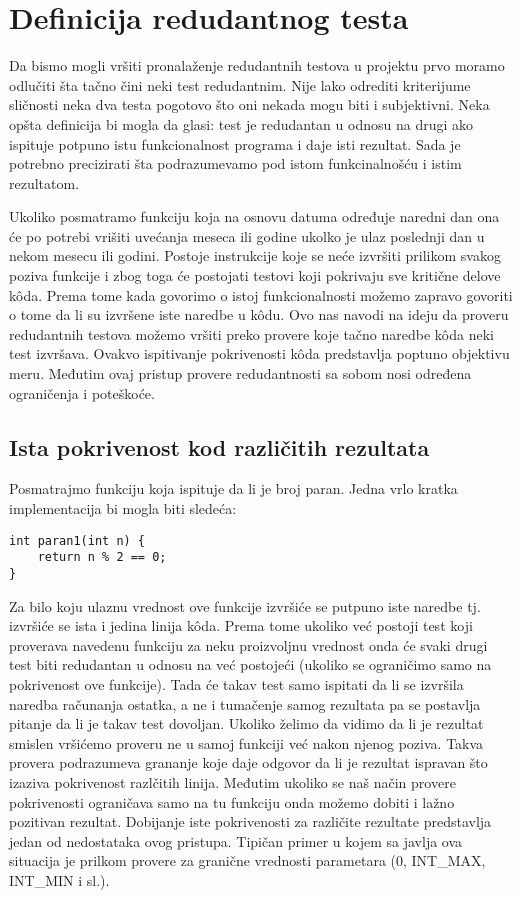 \documentclass[a4paper]{article}
\begin{document}
\section{Definicija redudantnog testa}
\label{sec:definition}
Da bismo mogli vršiti pronalaženje redudantnih testova u projektu prvo moramo odlučiti šta tačno čini neki test redudantnim. Nije lako odrediti kriterijume sličnosti neka dva testa pogotovo što oni nekada mogu biti i subjektivni. Neka opšta definicija bi mogla da glasi: test je redudantan u odnosu na drugi ako ispituje potpuno istu funkcionalnost programa i daje isti rezultat. Sada je potrebno precizirati šta podrazumevamo pod istom funkcinalnošću i istim rezultatom.

Ukoliko posmatramo funkciju koja na osnovu datuma određuje naredni dan ona će po potrebi vrišiti uvećanja meseca ili godine ukolko je ulaz poslednji dan u nekom mesecu ili godini. Postoje instrukcije koje se neće izvršiti prilikom svakog poziva funkcije i zbog toga će postojati testovi koji pokrivaju sve kritične delove kôda. Prema tome kada govorimo o istoj funkcionalnosti možemo zapravo govoriti o tome da li su izvršene iste naredbe u kôdu. Ovo nas navodi na ideju da proveru redudantnih testova možemo vršiti preko provere koje tačno naredbe kôda neki test izvršava. Ovakvo ispitivanje pokrivenosti kôda predstavlja poptuno objektivu meru. Međutim ovaj pristup provere redudantnosti sa sobom nosi određena ograničenja i poteškoće.

\subsection{Ista pokrivenost kod različitih rezultata}

Posmatrajmo funkciju koja ispituje da li je broj paran. Jedna vrlo kratka implementacija bi mogla biti sledeća:

\begin{lstlisting}
int paran1(int n) {
	return n % 2 == 0;
}
\end{lstlisting}

Za bilo koju ulaznu vrednost ove funkcije izvršiće se putpuno iste naredbe tj. izvršiće se ista i jedina linija kôda. Prema tome ukoliko već postoji test koji proverava navedenu funkciju za neku proizvoljnu vrednost onda će svaki drugi test biti redudantan u odnosu na već postojeći (ukoliko se ograničimo samo na pokrivenost ove funkcije). Tada će takav test samo ispitati da li se izvršila naredba računanja ostatka, a ne i tumačenje samog rezultata pa se postavlja pitanje da li je takav test dovoljan. Ukoliko želimo da vidimo da li je rezultat smislen vršićemo proveru ne u samoj funkciji već nakon njenog poziva. Takva provera podrazumeva grananje koje daje odgovor da li je rezultat ispravan što izaziva pokrivenost razlčitih linija. Međutim ukoliko se naš način provere pokrivenosti ograničava samo na tu funkciju onda možemo dobiti i lažno pozitivan rezultat. Dobijanje iste pokrivenosti za različite rezultate predstavlja jedan od nedostataka ovog pristupa. Tipičan primer u kojem sa javlja ova situacija je prilkom provere za granične vrednosti parametara (0, INT\_MAX, INT\_MIN i sl.).
\end{document}
